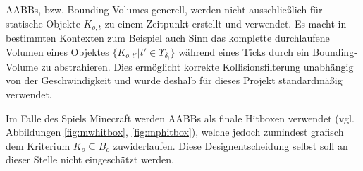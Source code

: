 AABBs, bzw. Bounding-Volumes generell, werden nicht ausschließlich für statische Objekte $K_{o,t}$ zu einem Zeitpunkt erstellt und verwendet. Es macht in bestimmten Kontexten zum Beispiel auch Sinn das komplette durchlaufene Volumen eines Objektes $\{K_{o,t'} | t' \in \Upsilon_{\delta_i}\}$ während eines Ticks durch ein Bounding-Volume zu abstrahieren. Dies ermöglicht korrekte Kollisionsfilterung unabhängig von der Geschwindigkeit und wurde deshalb für dieses Projekt standardmäßig verwendet.

Im Falle des Spiels Minecraft werden AABBs als finale Hitboxen verwendet (vgl. Abbildungen \ref{fig:mwhitbox}, \ref{fig:mphitbox}), welche jedoch zumindest grafisch dem Kriterium $K_o \subseteq B_o$ zuwiderlaufen. Diese Designentscheidung selbst soll an dieser Stelle nicht eingeschätzt werden.
